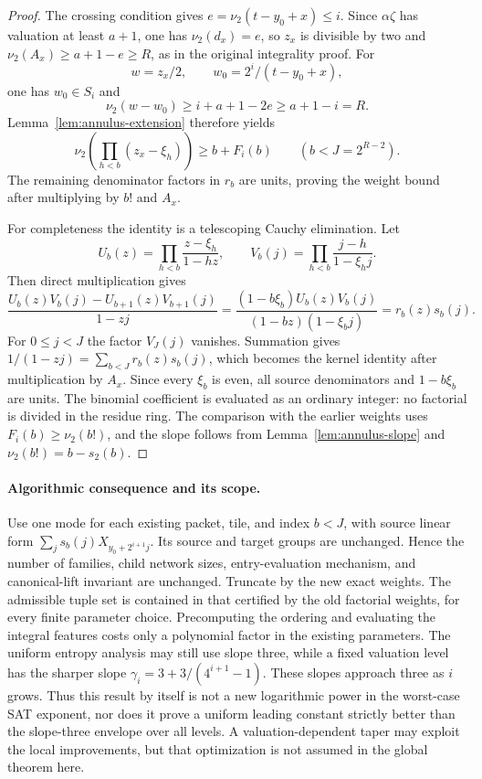 \begin{proof}
The crossing condition gives $e=\nu_2(t-y_0+x)\le i$. Since
$\alpha\zeta$ has valuation at least $a+1$, one has
$\nu_2(d_x)=e$, so $z_x$ is divisible by two and
$\nu_2(A_x)\ge a+1-e\ge R$, as in the original integrality proof.
For
\[
 w=z_x/2,\qquad w_0=2^i/(t-y_0+x),
\]
one has $w_0\in S_i$ and
\[
 \nu_2(w-w_0)\ge i+a+1-2e\ge a+1-i=R.
\]
Lemma~\ref{lem:annulus-extension} therefore yields
\[
 \nu_2\left(\prod_{h<b}(z_x-\xi_h)\right)
 \ge b+F_i(b)\qquad (b<J=2^{R-2}).
\]
The remaining denominator factors in $r_b$ are units, proving the
weight bound after multiplying by $b!$ and $A_x$.

For completeness the identity is a telescoping Cauchy elimination.
Let
\[
 U_b(z)=\prod_{h<b}\frac{z-\xi_h}{1-hz},\qquad
 V_b(j)=\prod_{h<b}\frac{j-h}{1-\xi_hj}.
\]
Then direct multiplication gives
\[
 \frac{U_b(z)V_b(j)-U_{b+1}(z)V_{b+1}(j)}{1-zj}
 =\frac{(1-b\xi_b)U_b(z)V_b(j)}{(1-bz)(1-\xi_bj)}
 =r_b(z)s_b(j).
\]
For $0\le j<J$ the factor $V_J(j)$ vanishes. Summation gives
$1/(1-zj)=\sum_{b<J}r_b(z)s_b(j)$, which becomes the kernel
identity after multiplication by $A_x$. Since every $\xi_b$ is even,
all source denominators and $1-b\xi_b$ are units. The binomial
coefficient is evaluated as an ordinary integer: no factorial is
divided in the residue ring. The comparison with the earlier weights
uses $F_i(b)\ge\nu_2(b!)$, and the slope follows from
Lemma~\ref{lem:annulus-slope} and
$\nu_2(b!)=b-s_2(b)$.
\end{proof}

\paragraph{Algorithmic consequence and its scope.}
Use one mode for each existing packet, tile, and index $b<J$, with
source linear form $\sum_j s_b(j)X_{y_0+2^{i+1}j}$. Its source and
target groups are unchanged. Hence the number of families, child
network sizes, entry-evaluation mechanism, and canonical-lift
invariant are unchanged. Truncate by the new exact weights.
The admissible tuple set is contained in that certified by the old
factorial weights, for every finite parameter choice. Precomputing
the ordering and evaluating the integral features costs only a
polynomial factor in the existing parameters. The uniform entropy
analysis may still use slope three, while a fixed valuation level
has the sharper slope
$\gamma_i=3+3/(4^{i+1}-1)$. These slopes approach three as $i$ grows.
Thus this result by itself is not a new logarithmic power in the
worst-case SAT exponent, nor does it prove a uniform leading constant
strictly better than the slope-three envelope over all levels.
A valuation-dependent taper may exploit the local improvements, but
that optimization is not assumed in the global theorem here.
